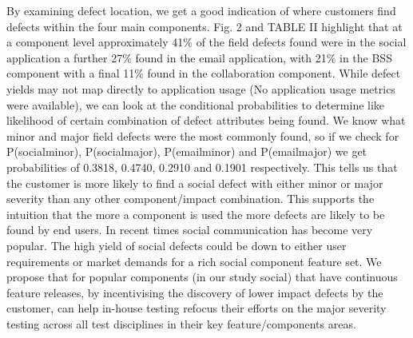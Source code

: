 \documentclass[conference]{IEEEtran}
\begin{document}
By examining defect location, we get a good indication of where customers find defects within the four main components. 
Fig. 2 and TABLE II highlight that at a component level approximately 41\% of the field defects found were in the social application a further 27\% found in the email application, with 21\% in the BSS component with a final 11\% found in the collaboration component. While defect yields may not map directly to application usage (No application usage metrics were available), we can look at the conditional probabilities to determine like likelihood of certain combination of defect attributes being found. We know what minor and major field defects were the most commonly found, so if we check for P(social\textbar minor), P(social\textbar major), P(email\textbar minor) and P(email\textbar major) we get probabilities of 0.3818, 0.4740, 0.2910 and 0.1901 respectively.  This tells us that the customer is more likely to find a social defect with either minor or major severity than any other component/impact combination. This supports the intuition that the more a component is used the more defects are likely to be found by end users.
In recent times social communication has become very popular. The high yield of social defects could be down to either user requirements or market demands for a rich social component feature set. We propose that for popular components (in our study social) that have continuous feature releases, by incentivising the discovery of lower impact defects by the customer, can help in-house testing refocus their efforts on the major severity testing across all test disciplines in their key feature/components areas. 
\end{document}
